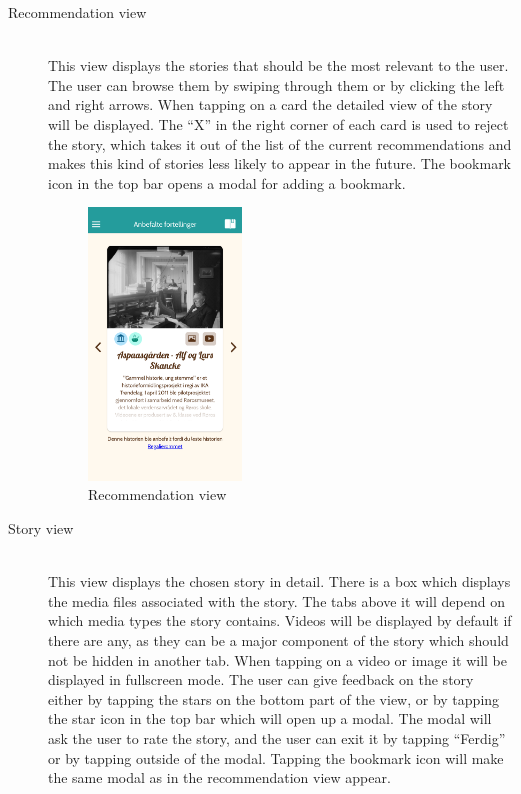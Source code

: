 \begin{description}
	
	\item[Recommendation view] \hfill \\ 
	This view displays the stories that should be the most relevant to the user. The user can browse them by swiping through them or by clicking the left and right arrows. When tapping on a card the detailed view of the story will be displayed. The “X” in the right corner of each card is used to reject the story, which takes it out of the list of the current recommendations and makes this kind of stories less likely to appear in the future. The bookmark icon in the top bar opens a modal for adding a bookmark. 
	
	\begin{figure}[h!]
		\centering
		\includegraphics[width=0.4\textwidth]{fig/screenshot_recommendations}
		\caption{Recommendation view}
		\label{Fig:recommendation_view}
	\end{figure}
	
	\item[Story view] \hfill \\
	This view displays the chosen story in detail. There is a box which displays the media files associated with the story. The tabs above it will depend on which media types the story contains. Videos will be displayed by default if there are any, as they can be a major component of the story which should not be hidden in another tab. When tapping on a video or image it will be displayed in fullscreen mode. The user can give feedback on the story either by tapping the stars on the bottom part of the view, or by tapping the star icon in the top bar which will open up a modal. The modal will ask the user to rate the story, and the user can exit it by tapping “Ferdig” or by tapping outside of the modal. Tapping the bookmark icon will make the same modal as in the recommendation view appear. 

\end{description}

